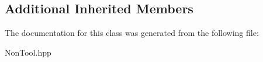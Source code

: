 \subsection*{Additional Inherited Members}


The documentation for this class was generated from the following file\+:\begin{DoxyCompactItemize}
\item 
Non\+Tool.\+hpp\end{DoxyCompactItemize}
